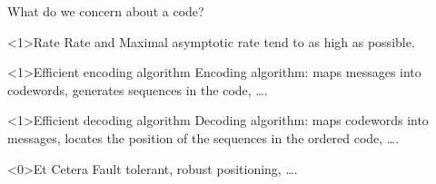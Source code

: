 \begin{frame}{What do we concern about a code?}
    \begin{block}<1>{Rate}
        Rate and Maximal asymptotic rate tend to as high as possible.
    \end{block}
    \begin{block}<1>{Efficient encoding algorithm}
        Encoding algorithm: maps messages into codewords, generates sequences in the code, \dots.
    \end{block}
    \begin{block}<1>{Efficient decoding algorithm}
        Decoding algorithm: maps codewords into messages, locates the position of the sequences in the ordered code, \dots.
    \end{block}
    \begin{block}<0>{Et Cetera}
        Fault tolerant, robust positioning, \dots.
    \end{block}
\end{frame}
